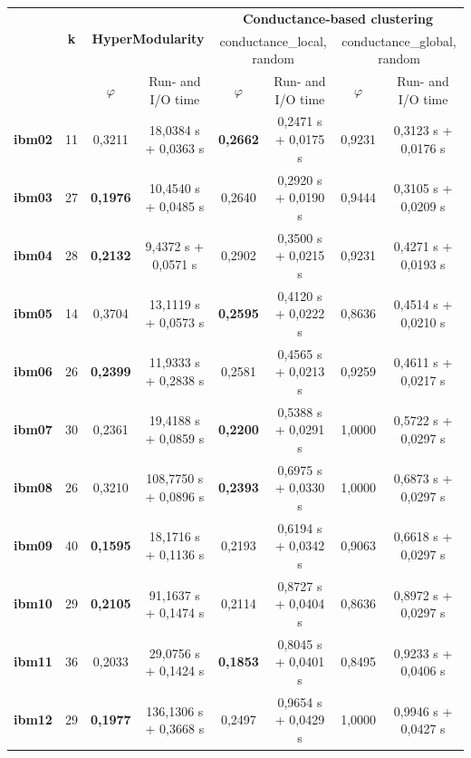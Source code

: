 \documentclass[acmsmall,nonacm,screen,review]{acmart}
\begin{document}
\begin{table}
    \centering
    \small
    \begin{tabular}{|c|c|c|c|c|c|c|c|} \hline
               & \multirow{2}{*}{\textbf{k}}  & \multicolumn{2}{c}{\multirow{2}{*}{{\textbf{HyperModularity}}}} & \multicolumn{4}{|c|}{\textbf{Conductance-based clustering}} \\ \cline{5-8}
               &       & \multicolumn{2}{c}{} & \multicolumn{2}{|c|}{conductance\_local, random}    & \multicolumn{2}{c|}{conductance\_global, random} \\ \hline
               &       & $\varphi$ & Run- and I/O time & $\varphi$ & Run- and I/O time & $\varphi$ & Run- and I/O time \\ \hline 
\textbf{ibm02} & 11         & 0,3211 & 18,0384 s + 0,0363 s  & \textbf{0,2662} & 0,2471 s + 0,0175 s & 0,9231 & 0,3123 s + 0,0176 s  \\ 
\textbf{ibm03} & 27         & \textbf{0,1976} & 10,4540 s + 0,0485 s  & 0,2640 & 0,2920 s + 0,0190 s & 0,9444 & 0,3105 s + 0,0209 s  \\ 
\textbf{ibm04} & 28         & \textbf{0,2132} & 9,4372 s + 0,0571 s   & 0,2902 & 0,3500 s + 0,0215 s & 0,9231 & 0,4271 s + 0,0193 s  \\ 
\textbf{ibm05} & 14         & 0,3704 & 13,1119 s + 0,0573 s  & \textbf{0,2595} & 0,4120 s + 0,0222 s & 0,8636 & 0,4514 s + 0,0210 s  \\ 
\textbf{ibm06} & 26         & \textbf{0,2399} & 11,9333 s + 0,2838 s  & 0,2581 & 0,4565 s + 0,0213 s & 0,9259 & 0,4611 s + 0,0217 s  \\ 
\textbf{ibm07} & 30         & 0,2361 & 19,4188 s + 0,0859 s  & \textbf{0,2200} & 0,5388 s + 0,0291 s & 1,0000 & 0,5722 s + 0,0297 s  \\ 
\textbf{ibm08} & 26         & 0,3210 & 108,7750 s + 0,0896 s & \textbf{0,2393} & 0,6975 s + 0,0330 s & 1,0000 & 0,6873 s + 0,0297 s  \\ 
\textbf{ibm09} & 40         & \textbf{0,1595} & 18,1716 s + 0,1136 s  & 0,2193 & 0,6194 s + 0,0342 s & 0,9063 & 0,6618 s + 0,0297 s  \\ 
\textbf{ibm10} & 29         & \textbf{0,2105} & 91,1637 s + 0,1474 s  & 0,2114 & 0,8727 s + 0,0404 s & 0,8636 & 0,8972 s + 0,0297 s  \\ 
\textbf{ibm11} & 36         & 0,2033 & 29,0756 s + 0,1424 s  & \textbf{0,1853} & 0,8045 s + 0,0401 s & 0,8495 & 0,9233 s + 0,0406 s  \\ 
\textbf{ibm12} & 29         & \textbf{0,1977} & 136,1306 s + 0,3668 s & 0,2497 & 0,9654 s + 0,0429 s & 1,0000 & 0,9946 s + 0,0427 s  \\ 

\end{tabular}
\end{table}
\end{document}
